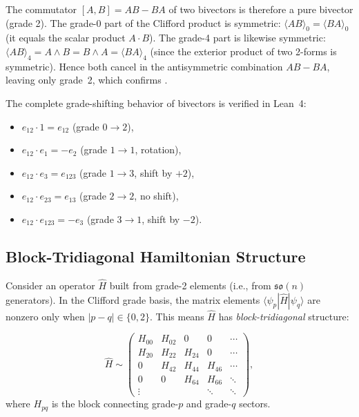 \documentclass[11pt]{article}
\newcommand{\so}{\mathfrak{so}}
\begin{document}
The commutator $[A, B] = AB - BA$ of two bivectors is therefore a
pure bivector (grade 2). The grade-0 part of the Clifford product
is symmetric: $\langle AB \rangle_0 = \langle BA \rangle_0$
(it equals the scalar product $A \cdot B$). The grade-4 part is
likewise symmetric: $\langle AB \rangle_4 = A \wedge B = B \wedge A
= \langle BA \rangle_4$ (since the exterior product of two
2-forms is symmetric). Hence both cancel in the antisymmetric
combination $AB - BA$, leaving only grade~2, which confirms
.

The complete grade-shifting behavior of bivectors is verified in Lean~4:
\begin{itemize}[leftmargin=*]
\item $e_{12} \cdot 1 = e_{12}$ \quad (grade $0 \to 2$),
\item $e_{12} \cdot e_1 = -e_2$ \quad (grade $1 \to 1$, rotation),
\item $e_{12} \cdot e_3 = e_{123}$ \quad (grade $1 \to 3$, shift by $+2$),
\item $e_{12} \cdot e_{23} = e_{13}$ \quad (grade $2 \to 2$, no shift),
\item $e_{12} \cdot e_{123} = -e_3$ \quad (grade $3 \to 1$, shift by $-2$).
\end{itemize}

\subsection{Block-Tridiagonal Hamiltonian Structure}

Consider an operator $\hat{H}$ built from grade-2 elements
(i.e., from $\so(n)$ generators). In the Clifford grade basis, the
matrix elements $\langle \psi_p | \hat{H} | \psi_q \rangle$ are
nonzero only when $|p - q| \in \{0, 2\}$. This means $\hat{H}$
has \emph{block-tridiagonal} structure:

\begin{equation}\label{eq:block-tridiag}
  \hat{H} \sim \begin{pmatrix}
    H_{00} & H_{02} & 0 & 0 & \cdots \\
    H_{20} & H_{22} & H_{24} & 0 & \cdots \\
    0 & H_{42} & H_{44} & H_{46} & \cdots \\
    0 & 0 & H_{64} & H_{66} & \ddots \\
    \vdots & & & \ddots & \ddots
  \end{pmatrix},
\end{equation}
where $H_{pq}$ is the block connecting grade-$p$ and grade-$q$ sectors.
\end{document}
